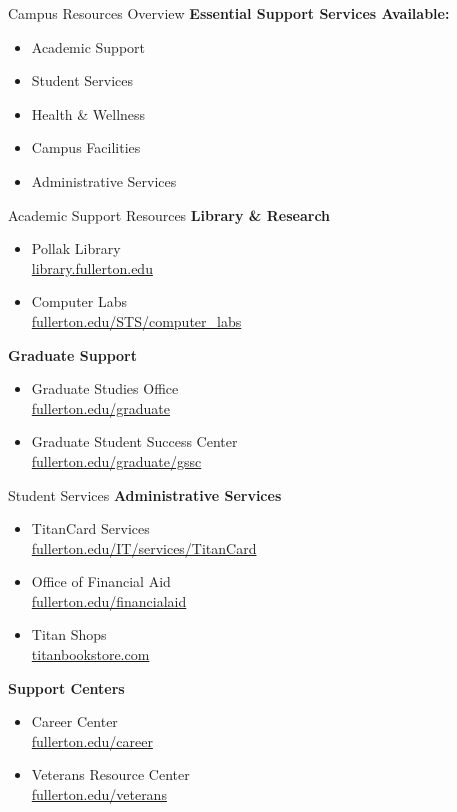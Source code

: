 \documentclass[10pt]{beamer}
\begin{document}
    
\begin{frame}{Campus Resources Overview}
    \textbf{Essential Support Services Available:}
    \begin{itemize}
    \item Academic Support
    \item Student Services
    \item Health \& Wellness
    \item Campus Facilities
    \item Administrative Services
    \end{itemize}
        \end{frame}
    
    \begin{frame}{Academic Support Resources}
    \textbf{Library \& Research}
    \begin{itemize}
    \item Pollak Library \\
        \small{\url{library.fullerton.edu}}
    \item Computer Labs \\
        \small{\url{fullerton.edu/STS/computer_labs}}
    \end{itemize}
    
    \textbf{Graduate Support}
    \begin{itemize}
    \item Graduate Studies Office \\
        \small{\url{fullerton.edu/graduate}}
    \item Graduate Student Success Center \\
        \small{\url{fullerton.edu/graduate/gssc}}
    \end{itemize}
    \end{frame}
    
    \begin{frame}{Student Services}
    \textbf{Administrative Services}
    \begin{itemize}
    \item TitanCard Services \\
        \small{\url{fullerton.edu/IT/services/TitanCard}}
    \item Office of Financial Aid \\
        \small{\url{fullerton.edu/financialaid}}
    \item Titan Shops \\
        \small{\url{titanbookstore.com}}
    \end{itemize}
    
    \textbf{Support Centers}
    \begin{itemize}
    \item Career Center \\
        \small{\url{fullerton.edu/career}}
    \item Veterans Resource Center \\
        \small{\url{fullerton.edu/veterans}}
    \end{itemize}
    \end{frame}
    
\end{document}
